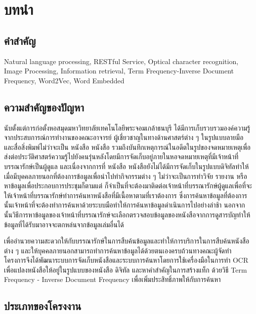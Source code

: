 \chapter{บทนำ}

\section{คำสำคัญ}

Natural language processing, RESTful Service, Optical character recognition, Image Processing, Information retrieval, Term Frequency-Inverse Document Frequency, Word2Vec, Word Embedded 

\section{ความสำคัญของปัญหา}

นับตั้งแต่การก่อตั้งหอสมุดมหาวิทยาลัยเทคโนโลยีพระจอมเกล้าธนบุรี ได้มีการเก็บรวบรวมองค์ความรู้จากประสบการณ์การทำงานของคณะอาจารย์ ผู้เชี่ยวชาญในทางด้านศาสตร์ต่าง ๆ ในรูปแบบลายมือและสื่อสิ่งพิมพ์ไม่ว่าจะเป็น หนังสือ หนังสือ รวมถึงบันทึกเหตุการณ์ในอดีตในรูปของจดหมายเหตุเพื่อส่งต่อประวัติศาสตร์ความรู้ไปยังคนรุ่นหลังโดยมีการจัดเก็บอยู่ภายในหอจดหมายเหตุที่มีเจ้าหน้าที่บรรณารักษ์เป็นผู้ดูแล และเนื่องจากการที่ หนังสือ หนังสือยังไม่ได้มีการจัดเก็บในรูปแบบดิจิทัลทำให้เมื่อมีบุคคลภายนอกที่ต้องการข้อมูลเพื่อนำไปทำกิจกรรมต่าง ๆ ไม่ว่าจะเป็นการทำวิจัย รายงาน หรือหาข้อมูลเพื่อประกอบการประชุมก็ตามแต่ ก็จำเป็นที่จะต้องมาติดต่อเจ้าหน้าที่บรรณารักษ์ผู้ดูแลเพื่อที่จะให้เจ้าหน้าที่บรรณารักษ์ทำการค้นหาหนังสือที่มีเนื้อหาตามที่เราต้องการ ซึ่งการค้นหาข้อมูลที่ต้องการนั้นเจ้าหน้าที่จะต้องทำการค้นหาด้วยระบบมือทำให้การค้นหาข้อมูลดำเนินการไปอย่างล่าช้า นอกจากนั้นวิธีการหาข้อมูลของเจ้าหน้าที่บรรณารักษ์จะเลือกตรวจสอบข้อมูลของหนังสือจากการดูสารบัญทำให้ข้อมูลที่ได้รับมาอาจจะตกหล่นจากข้อมูลเล่มอื่นได้ 

เพื่ออำนวยความสะดวกให้กับบรรณารักษ์ในการสืบค้นข้อมูลและทำให้การบริการในการสืบค้นหนังสือต่าง ๆ และให้บุคคลภายนอกสามารถทำการค้นหาข้อมูลได้ด้วยตนเองครบถ้วนทางคณะผู้จัดทำโครงการจึงได้พัฒนาระบบการจัดเก็บหนังสือและระบบการค้นหาโดยการใช้เครื่องมือในการทำ OCR เพื่อแปลงหนังสือให้อยู่ในรูปแบบของหนังสือ ดิจิทัล และหาคำสำคัญในการสร้างแท็ก ด้วยวิธี Term Frequency - Inverse Document Frequency เพื่อเพิ่มประสิทธิ์ภาพให้กับการค้นหา 

\section{ประเภทของโครงงาน}

